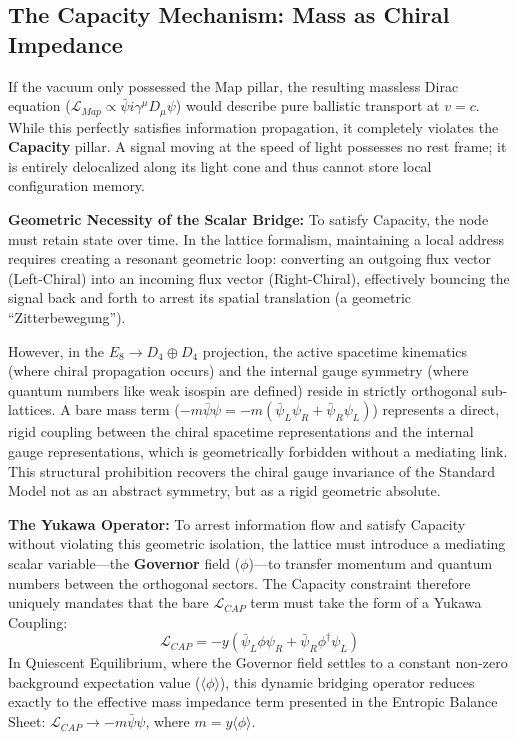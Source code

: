 \subsection{The Capacity Mechanism: Mass as Chiral Impedance}

If the vacuum only possessed the Map pillar, the resulting massless Dirac equation ($\mathcal{L}_{Map} \propto \bar{\psi} i\gamma^\mu D_\mu \psi$) would describe pure ballistic transport at $v=c$. While this perfectly satisfies information propagation, it completely violates the \textbf{Capacity} pillar. A signal moving at the speed of light possesses no rest frame; it is entirely delocalized along its light cone and thus cannot store local configuration memory.

\textbf{Geometric Necessity of the Scalar Bridge:} To satisfy Capacity, the node must retain state over time. In the lattice formalism, maintaining a local address requires creating a resonant geometric loop: converting an outgoing flux vector (Left-Chiral) into an incoming flux vector (Right-Chiral), effectively bouncing the signal back and forth to arrest its spatial translation (a geometric ``Zitterbewegung'').

However, in the $E_8 \to D_4 \oplus D_4$ projection, the active spacetime kinematics (where chiral propagation occurs) and the internal gauge symmetry (where quantum numbers like weak isospin are defined) reside in strictly orthogonal sub-lattices. A bare mass term ($-m\bar{\psi}\psi = -m(\bar{\psi}_L\psi_R + \bar{\psi}_R\psi_L)$) represents a direct, rigid coupling between the chiral spacetime representations and the internal gauge representations, which is geometrically forbidden without a mediating link. This structural prohibition recovers the chiral gauge invariance of the Standard Model not as an abstract symmetry, but as a rigid geometric absolute.

\textbf{The Yukawa Operator:} To arrest information flow and satisfy Capacity without violating this geometric isolation, the lattice must introduce a mediating scalar variable---the \textbf{Governor} field ($\phi$)---to transfer momentum and quantum numbers between the orthogonal sectors. The Capacity constraint therefore uniquely mandates that the bare $\mathcal{L}_{CAP}$ term must take the form of a Yukawa Coupling:
\begin{equation}
    \mathcal{L}_{CAP} = -y \left( \bar{\psi}_L \phi \psi_R + \bar{\psi}_R \phi^\dagger \psi_L \right)
\end{equation}
In Quiescent Equilibrium, where the Governor field settles to a constant non-zero background expectation value ($\langle\phi\rangle$), this dynamic bridging operator reduces exactly to the effective mass impedance term presented in the Entropic Balance Sheet: $\mathcal{L}_{CAP} \to -m\bar{\psi}\psi$, where $m = y\langle\phi\rangle$.

